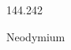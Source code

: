 \documentclass[12pt]{article}
\begin{document}
\hfill{}
\vfill
\begin{center}
  {\fontsize{50}{60}
  }

  \vspace{1em}

  144.242

Neodymium
\end{center}
\vfill
\end{document}
